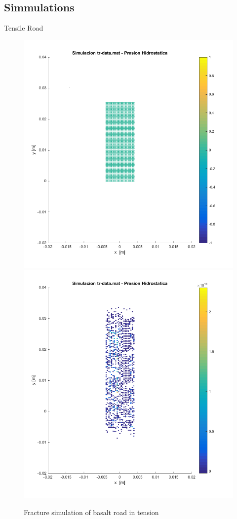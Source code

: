 \documentclass[10pt]{beamer}
\begin{document}
\subsection{Simmulations}
\begin{frame}{Tensile Road}
\begin{figure}[h!]
\includegraphics[scale=.25]{./images/tr_i.png}
\includegraphics[scale=.25]{./images/tr_f.png}
\caption{Fracture simulation of basalt road in tension}
\end{figure}
\end{frame}
\end{document}
